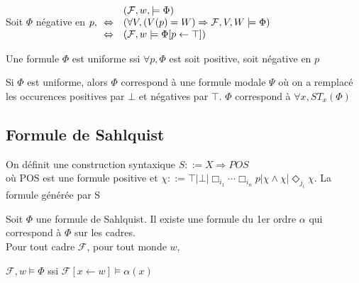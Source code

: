 \documentclass[10pt,a4paper]{article}
\newcommand{\F}{\mathcal{F}}
\begin{document}
\begin{cor}
Soit $\Phi$ négative en $p, \\
\begin{array}{ll}
 & (\F, w, \models \Phi )\\
\Leftrightarrow & (\forall V, (V(p) = W) \Rightarrow \F, V, W \models \Phi)\\
\Leftrightarrow & (\F, w \models \Phi [p \leftarrow \top])
\end{array}$
\end{cor}


\begin{definition}
 Une formule $\Phi$ est uniforme ssi $\forall p, \Phi$ est soit positive, soit négative en $p$
\end{definition}

\begin{prop}
 Si $\Phi$ est uniforme, alors $\Phi$ correspond à une formule modale $\Psi$  où on a remplacé les occurences positives par $\bot$ et négatives par $\top$. $\Phi$ correspond à $\forall x, ST_x( \Phi)$
\end{prop}



\subsection{Formule de Sahlquist}
On définit une construction syntaxique $S ::= X \Rightarrow POS$\\
où POS est une formule positive et $\chi ::= \top  |  \bot  |  \Box_{i_1} \cdots \Box_{i_n}p  |  \chi \wedge \chi  |  \Diamond_{j_i} \chi$.
La formule générée par S
\begin{thm} Soit $\Phi$ une formule de Sahlquist. Il existe une formule du 1er ordre $\alpha$ qui correspond à $\Phi$ sur les cadres.\\
Pour tout cadre $\F$, pour tout monde $w$,

$\F, w \models \Phi$ ssi $\F[x \leftarrow w] \models \alpha(x)$
\end{thm}
\end{document}
